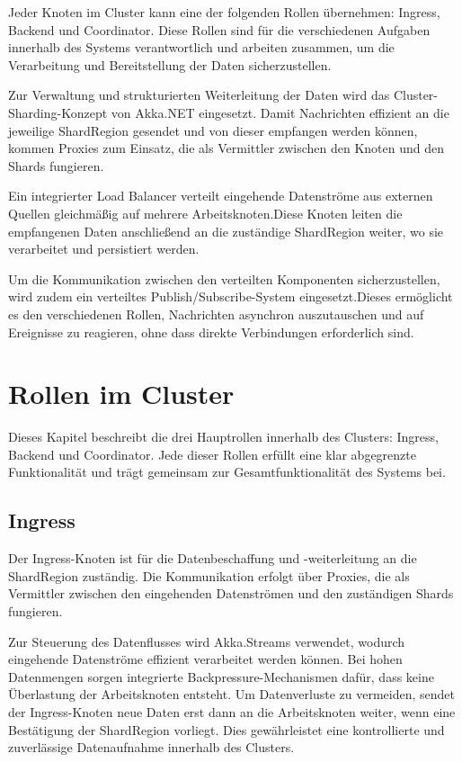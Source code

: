 Jeder Knoten im Cluster kann eine der folgenden Rollen übernehmen: Ingress, Backend und Coordinator.
Diese Rollen sind für die verschiedenen Aufgaben innerhalb des Systems verantwortlich und arbeiten zusammen, 
um die Verarbeitung und Bereitstellung der Daten sicherzustellen.

Zur Verwaltung und strukturierten Weiterleitung der Daten wird das Cluster-Sharding-Konzept von Akka.NET eingesetzt.
Damit Nachrichten effizient an die jeweilige ShardRegion gesendet und von dieser empfangen werden können, 
kommen Proxies zum Einsatz, die als Vermittler zwischen den Knoten und den Shards fungieren.

Ein integrierter Load Balancer verteilt eingehende Datenströme aus externen Quellen gleichmäßig 
auf mehrere Arbeitsknoten.Diese Knoten leiten die empfangenen Daten anschließend an die zuständige 
ShardRegion weiter, wo sie verarbeitet und persistiert werden.

Um die Kommunikation zwischen den verteilten Komponenten sicherzustellen, wird zudem ein verteiltes 
Publish/Subscribe-System eingesetzt.Dieses ermöglicht es den verschiedenen Rollen, Nachrichten 
asynchron auszutauschen und auf Ereignisse zu reagieren, ohne dass direkte Verbindungen erforderlich sind.


\section{Rollen im Cluster}

Dieses Kapitel beschreibt die drei Hauptrollen innerhalb des Clusters: Ingress, Backend 
und Coordinator. Jede dieser Rollen erfüllt eine klar abgegrenzte Funktionalität und trägt 
gemeinsam zur Gesamtfunktionalität des Systems bei.

\subsection{Ingress}

Der Ingress-Knoten ist für die Datenbeschaffung und -weiterleitung an die ShardRegion zuständig.
Die Kommunikation erfolgt über Proxies, die als Vermittler zwischen den eingehenden Datenströmen 
und den zuständigen Shards fungieren.

Zur Steuerung des Datenflusses wird Akka.Streams verwendet, wodurch eingehende Datenströme 
effizient verarbeitet werden können. Bei hohen Datenmengen sorgen integrierte Backpressure-Mechanismen 
dafür, dass keine Überlastung der Arbeitsknoten entsteht. Um Datenverluste zu vermeiden, sendet 
der Ingress-Knoten neue Daten erst dann an die Arbeitsknoten weiter, wenn eine Bestätigung der 
ShardRegion vorliegt. Dies gewährleistet eine kontrollierte und zuverlässige Datenaufnahme 
innerhalb des Clusters.

